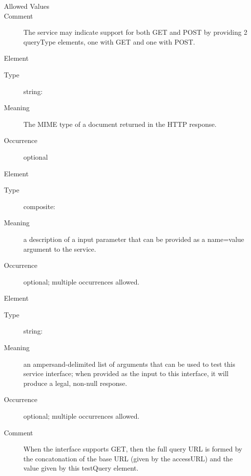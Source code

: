 \documentclass[11pt,a4paper]{ivoa}
\begin{document}
\begin{generated}
\begin{bigdescription}
\begin{description}
\item[Allowed Values]\hfil
\begin{longtermsdescription}
\item[GET]
\item[POST]
\end{longtermsdescription}
\item[Comment] 
                       The service may indicate support for both GET
                       and POST by providing 2 queryType elements, one
                       with GET and one with POST.
                     

\end{description}
\item[Element \xmlel{resultType}]
\begin{description}
\item[Type] string: 
\item[Meaning] 
                       The MIME type of a document returned in the HTTP response.
                     
\item[Occurrence] optional

\end{description}
\item[Element \xmlel{param}]
\begin{description}
\item[Type] composite: 
\item[Meaning] 
                       a description of a input parameter that can be 
                       provided as a name=value argument to the service.  
                    
\item[Occurrence] optional; multiple occurrences allowed.

\end{description}
\item[Element \xmlel{testQuery}]
\begin{description}
\item[Type] string: 
\item[Meaning] 
                       an ampersand-delimited list of arguments that
                       can be used to test this service interface; 
                       when provided as the input to this interface,
                       it will produce a legal, non-null response.
                    
\item[Occurrence] optional; multiple occurrences allowed.
\item[Comment] 
                       When the interface supports GET, then the full 
                       query URL is formed by the concatonation of the 
                       base URL (given by the accessURL) and the value 
                       given by this testQuery element.  
                    

\end{description}


\end{bigdescription}\endgroup

\endgroup
\end{generated}
\end{document}
